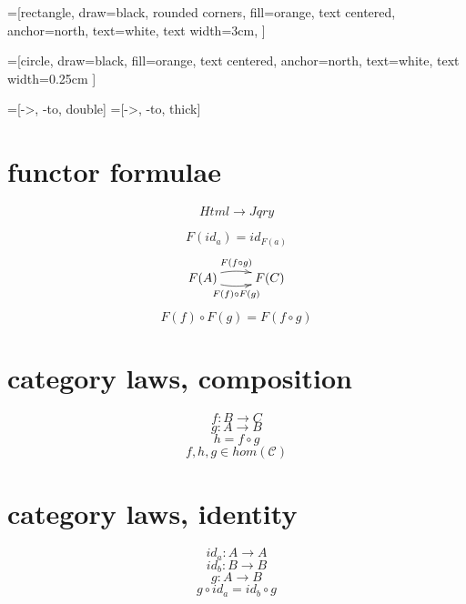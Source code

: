 \documentclass[11hpt]{article}
\begin{document}
=[rectangle, draw=black, rounded corners, fill=orange,
        text centered, anchor=north, text=white, text width=3cm, ]

=[circle, draw=black, fill=orange,
        text centered, anchor=north, text=white, text width=0.25cm ]

=[->, -to, double]
=[->, -to, thick]

\section{functor formulae}
\begin{equation} \label{eq:functor-html-jqry}
Html \to Jqry
\end{equation}

\begin{equation} \label{eq:functor-id}
  F(id_{a}) = id_{F(a)}
\end{equation}
\begin{equation} \label{eq:functor-arrows}
  \xymatrix{ F(A) \ar@/^/[r]^{F(f \circ g)} \ar@/_/[r]_{F(f) \circ F(g)} & F(C) }
\end{equation}
\begin{equation} \label{eq:functor-equate}
  F(f) \circ F(g) = F(f \circ g)
\end{equation}

\section{category laws, composition}
\begin{equation}
f: B \to C
\end{equation}
\begin{equation}
g: A \to B
\end{equation}
\begin{equation}
h = f \circ g
\end{equation}
\begin{equation}
f,h,g \in hom(\mathcal{C})
\end{equation}

\section{category laws, identity}
\begin{equation}
id_{a}: A \to A
\end{equation}
\begin{equation}
id_{b}: B \to B
\end{equation}
\begin{equation}
g: A \to B
\end{equation}
\begin{equation}
g \circ id_{a} = id_{b} \circ g
\end{equation}
\end{document}
